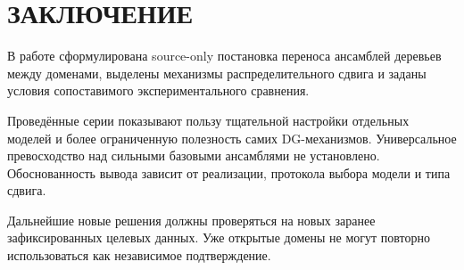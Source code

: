 \chapter*{ЗАКЛЮЧЕНИЕ}

В работе сформулирована source-only постановка переноса ансамблей деревьев между доменами, выделены механизмы распределительного сдвига и заданы условия сопоставимого экспериментального сравнения.

Проведённые серии показывают пользу тщательной настройки отдельных моделей и более ограниченную полезность самих DG-механизмов. Универсальное превосходство над сильными базовыми ансамблями не установлено. Обоснованность вывода зависит от реализации, протокола выбора модели и типа сдвига.

Дальнейшие новые решения должны проверяться на новых заранее зафиксированных целевых данных. Уже открытые домены не могут повторно использоваться как независимое подтверждение.
